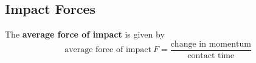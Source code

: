 \subsection{Impact Forces}

The \textbf{average force of impact} is given by
$$\text{average force of impact}\ F=\frac{\text{change in momentum}}{\text{contact time}}$$
